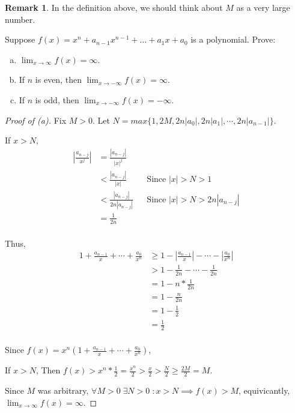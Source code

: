 \documentclass{article} %
\theoremstyle{plain}
\theoremstyle{definition}
\newtheorem*{remark*}{Remark}
\begin{document}
\begin{remark*} In the definition above, we should think about $M$ as a very large number. 
\end{remark*}

\noindent{} Suppose $f(x) = x^n + a_{n-1} x^{n-1} + \dots + a_1 x + a_0$ is a polynomial. Prove:
\begin{enumerate}[(a)]
\item $\lim_{x \rightarrow\infty} f(x) = \infty$.
\item If $n$ is even, then  $\lim_{x \rightarrow-\infty} f(x) = \infty$. 
\item If $n$ is odd, then  $\lim_{x \rightarrow-\infty} f(x) = -\infty$.
\end{enumerate}

\begin{proof}[Proof of (a)] 
    Fix $M > 0$. Let $N = max\{1, 2M, 2n|a_0|, 2n|a_1|, \cdots, 2n|a_{n-1}| \}$. 

    If $x > N$,
    \begin{align*}
        | \frac{a_{n-j}}{x^j} | & = \frac{|a_{n-j}|}{|x|^j} & & \\
        & < \frac{|a_{n-j}|}{|x|} & & \text{Since $|x| > N > 1$} \\
        & < \frac{|a_{n-j}|}{2n|a_{n-j}|} & & \text{Since $|x| > N > 2n|a_{n-j}|$} \\
        & = \frac{1}{2n} & & \\
    \end{align*}

    Thus,
    \begin{align*}
        1 + \frac{a_{n-1}}{x} + \cdots + \frac{a_0}{x^n} & \geq 1 - |\frac{a_{n-1}}{x}| - \cdots - |\frac{a_0}{x^n}| \\
        & > 1 - \frac{1}{2n} - \cdots - \frac{1}{2n} \\
        & = 1 - n * \frac{1}{2n} \\
        & = 1 - \frac{n}{2n} \\
        & = 1 - \frac{1}{2} \\
        & = \frac{1}{2} \\
    \end{align*}

    Since $f(x) = x^n(1 + \frac{a_{n-1}}{x} + \cdots + \frac{a_0}{x^n})$,

    If $x > N$, Then $f(x) > x^n * \frac{1}{2} = \frac{x^n}{2} > \frac{x}{2} > \frac{N}{2} \geq \frac{2M}{2} = M$.
    
    Since $M$ was arbitrary, $\forall M > 0 \; \exists N > 0 \; \colon x > N \implies f(x) > M$, equivicantly, $\lim_{x \to \infty} f(x) = \infty$.
\end{proof} 
\end{document}
